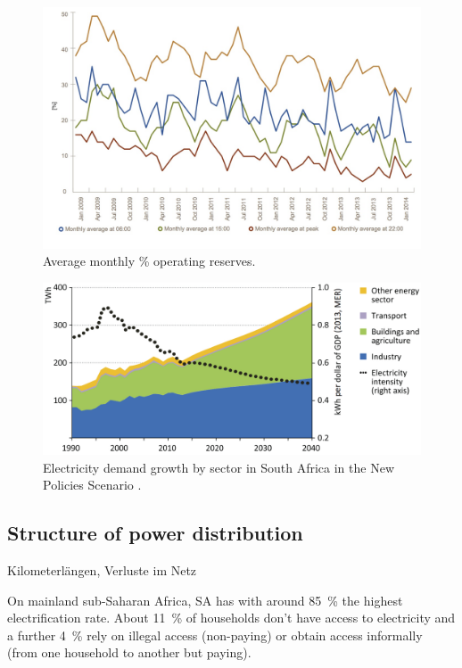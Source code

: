 \documentclass[Master,MEE,english]{twbook}%
\begin{document}
\begin{figure}[!h] %
\centering
\includegraphics[width=0.9\linewidth]{FIG/AveragemonthlySA}
\caption[Average monthly \% operating reserves.]{Average monthly \% operating reserves\cite{Eskom2014}.}\label{Abb1}
\end{figure}


\begin{figure}[!h] %
\centering
\includegraphics[width=0.9\linewidth]{FIG/SA_Electricity_demand_growth}
\caption[Electricity demand growth by sector in South Africa in the New Policies Scenario.]{Electricity demand growth by sector in South Africa in the New Policies Scenario \cite{IEA2014f}.}\label{Abb1}
\end{figure}

\subsection{Structure of power distribution}
Kilometerlängen, Verluste im Netz \cite{Eskom2014a}

On mainland sub-Saharan Africa, SA has with around 85~\% the highest electrification rate. About 11~\% of households don't have access to electricity and a further 4~\% rely on illegal access (non-paying) or obtain access informally (from one household to another but paying). \cite{IEA2014f}
\end{document}
